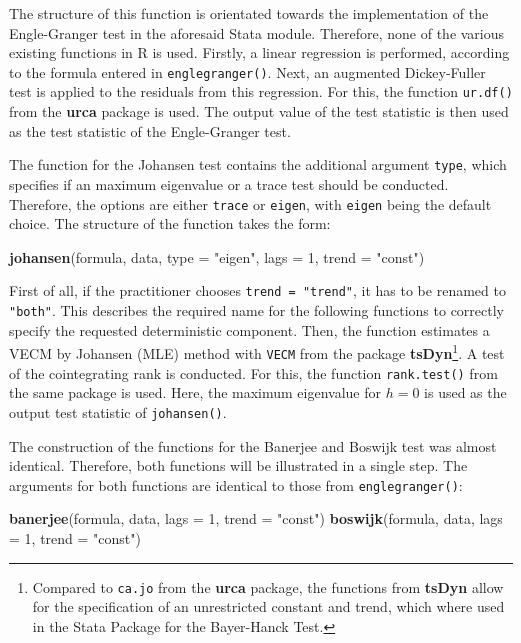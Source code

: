 \documentclass[11pt,a4paper]{article}
\newenvironment{Shaded}{\begin{snugshade}}{\end{snugshade}}
\newcommand{\DataTypeTok}[1]{\textcolor[rgb]{0.13,0.29,0.53}{#1}}
\newcommand{\DecValTok}[1]{\textcolor[rgb]{0.00,0.00,0.81}{#1}}
\newcommand{\KeywordTok}[1]{\textcolor[rgb]{0.13,0.29,0.53}{\textbf{#1}}}
\newcommand{\NormalTok}[1]{#1}
\newcommand{\StringTok}[1]{\textcolor[rgb]{0.31,0.60,0.02}{#1}}
\let\rmarkdownfootnote\footnote%
\def\footnote{\protect\rmarkdownfootnote}
\begin{document}
The structure of this function is orientated towards the implementation
of the Engle-Granger test in the aforesaid Stata module. Therefore, none
of the various existing functions in R is used. Firstly, a linear
regression is performed, according to the formula entered in
\texttt{englegranger()}. Next, an augmented Dickey-Fuller test is
applied to the residuals from this regression. For this, the function
\texttt{ur.df()} from the \textbf{urca} package is used. The output
value of the test statistic is then used as the test statistic of the
Engle-Granger test.

The function for the Johansen test contains the additional argument
\texttt{type}, which specifies if an maximum eigenvalue or a trace test
should be conducted. Therefore, the options are either \texttt{trace} or
\texttt{eigen}, with \texttt{eigen} being the default choice. The
structure of the function takes the form:

\begin{Shaded}
\begin{Highlighting}[]
\KeywordTok{johansen}\NormalTok{(formula, data, }\DataTypeTok{type =} \StringTok{"eigen"}\NormalTok{, }\DataTypeTok{lags =} \DecValTok{1}\NormalTok{, }\DataTypeTok{trend =} \StringTok{"const"}\NormalTok{)}
\end{Highlighting}
\end{Shaded}

First of all, if the practitioner chooses \texttt{trend\ =\ "trend"}, it
has to be renamed to \texttt{"both"}. This describes the required name
for the following functions to correctly specify the requested
deterministic component. Then, the function estimates a VECM by Johansen
(MLE) method with \texttt{VECM} from the package
\textbf{tsDyn}\footnote{Compared to \texttt{ca.jo} from the
  \textbf{urca} package, the functions from \textbf{tsDyn} allow for the
  specification of an unrestricted constant and trend, which where used
  in the Stata Package for the Bayer-Hanck Test.}. A test of the
cointegrating rank is conducted. For this, the function
\texttt{rank.test()} from the same package is used. Here, the maximum
eigenvalue for \(h = 0\) is used as the output test statistic of
\texttt{johansen()}.

The construction of the functions for the Banerjee and Boswijk test was
almost identical. Therefore, both functions will be illustrated in a
single step. The arguments for both functions are identical to those
from \texttt{englegranger()}:

\begin{Shaded}
\begin{Highlighting}[]
\KeywordTok{banerjee}\NormalTok{(formula, data, }\DataTypeTok{lags =} \DecValTok{1}\NormalTok{, }\DataTypeTok{trend =} \StringTok{"const"}\NormalTok{)}
\KeywordTok{boswijk}\NormalTok{(formula, data, }\DataTypeTok{lags =} \DecValTok{1}\NormalTok{, }\DataTypeTok{trend =} \StringTok{"const"}\NormalTok{)}
\end{Highlighting}
\end{Shaded}
\end{document}
